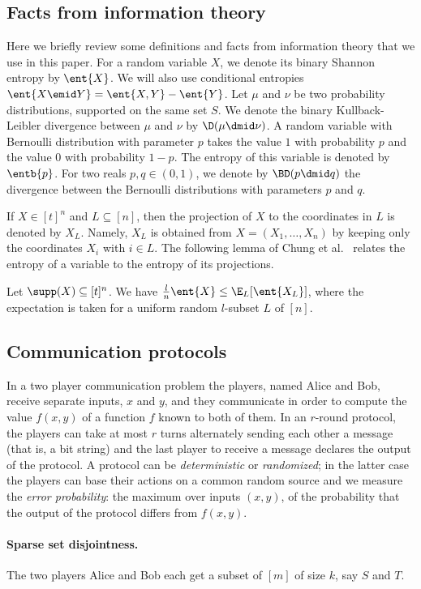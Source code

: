 \subsection{Facts from information theory}
\label{sec:prelim:infotheory}
Here we briefly review some definitions and facts from
information theory that we use in this paper. For a random
variable $X$, we denote its binary Shannon entropy by $\ent{X}$.
We will also use conditional entropies $\ent{X\emid
Y}=\ent{X,Y}-\ent{Y}$. Let $\mu$ and $\nu$ be two probability
distributions, supported on the same set $S$. We denote the
binary Kullback-Leibler divergence between $\mu$ and $\nu$ by
$\D(\mu\dmid \nu)$. A random variable with Bernoulli
distribution with parameter $p$ takes the value $1$ with
probability $p$ and the value $0$ with probability $1-p$. The
entropy of this variable is denoted by $\entb{p}$. For two reals
$p,q\in (0,1)$, we denote by $\BD(p\dmid q)$ the divergence
between the Bernoulli distributions with parameters $p$ and $q$.

If $X\in[t]^n$ and $L\subseteq[n]$, then the projection of $X$
to the coordinates in $L$ is denoted by $X_L$. Namely, $X_L$ is
obtained from $X=(X_1,\ldots,X_n)$ by keeping only the
coordinates $X_i$ with $i\in L$. The following lemma of Chung et
al.~\cite{ChungGFS1986} relates the entropy of a variable to the
entropy of its projections.
\begin{lemma}
\label{lem:ent-subset}
Let $\supp(X)\subseteq[t]^n$. We have
$\frac{l}{n}\ent{X} \leq \E_L[\ent{X_L}]$, where the expectation is taken for
a uniform random $l$-subset $L$ of $[n]$.
\end{lemma}

\subsection{Communication protocols}
\label{sec:prelim:comm}
In a two player communication problem the players, named Alice
and Bob, receive separate inputs, $x$ and $y$, and they
communicate in order to compute the value $f(x,y)$ of a function
$f$ known to both of them.
In an $r$-round protocol, the players can take at most $r$
turns alternately sending each other a message 
(that is, a bit string) and the last
player to receive a message declares the output of the protocol.
A protocol can be {\em deterministic} or {\em randomized}; in
the latter case the players can base their actions on a common
random source and we measure the {\em error probability}: the
maximum over inputs $(x,y)$, of the probability that the output
of the protocol differs from $f(x,y)$.

\paragraph{Sparse set disjointness.}
The two players Alice and Bob each get a subset of $[m]$
of size $k$, say $S$ and $T$.
